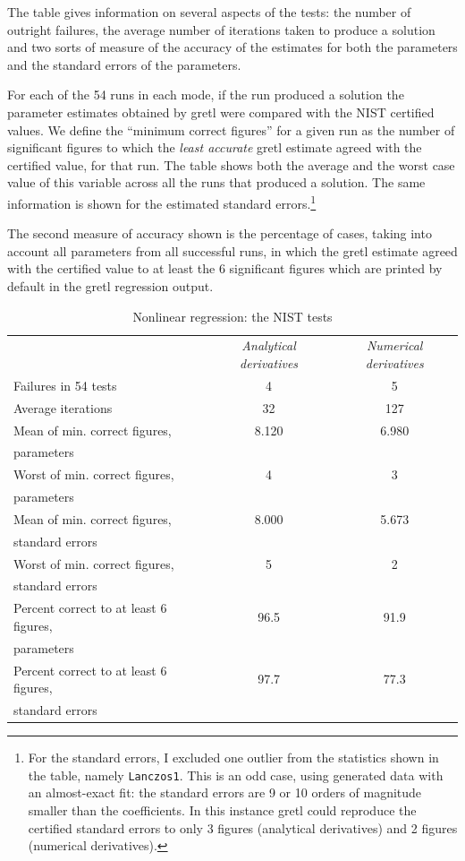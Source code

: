 The table gives information on several aspects of the tests: the
number of outright failures, the average number of iterations taken to
produce a solution and two sorts of measure of the accuracy of the
estimates for both the parameters and the standard errors of the
parameters.

For each of the 54 runs in each mode, if the run produced a solution
the parameter estimates obtained by gretl were compared with the
NIST certified values.  We define the ``minimum correct figures'' for
a given run as the number of significant figures to which the
\emph{least accurate} gretl estimate agreed with the certified
value, for that run. The table shows both the average and the worst
case value of this variable across all the runs that produced a
solution.  The same information is shown for the estimated standard
errors.\footnote{For the standard errors, I excluded one outlier from
  the statistics shown in the table, namely \verb+Lanczos1+.  This is
  an odd case, using generated data with an almost-exact fit: the
  standard errors are 9 or 10 orders of magnitude smaller than the
  coefficients.  In this instance gretl could reproduce the
  certified standard errors to only 3 figures (analytical derivatives)
  and 2 figures (numerical derivatives).}  

The second measure of accuracy shown is the percentage of cases,
taking into account all parameters from all successful runs, in which
the gretl estimate agreed with the certified value to at least
the 6 significant figures which are printed by default in the
gretl regression output.

\begin{table}[htbp]
 \caption{Nonlinear regression: the NIST tests}
 \label{tab-nls}
  \begin{center}
    \begin{tabular}{lcc}
      & \textit{Analytical derivatives} & 
      \textit{Numerical derivatives} \\ [4pt]
        Failures in 54 tests & 4 & 5\\
        Average iterations & 32 & 127\\
        Mean of min. correct figures, & 8.120 & 6.980\\
        parameters \\
        Worst of min. correct figures, & 4 & 3\\
        parameters \\
        Mean of min. correct figures, & 8.000 & 5.673\\
        standard errors \\
        Worst of min. correct figures, & 5 & 2\\
        standard errors \\
        Percent correct to at least 6 figures, & 96.5 & 91.9\\
        parameters \\
        Percent correct to at least 6 figures, & 97.7 & 77.3\\
        standard errors \\
      \end{tabular}
    \end{center}
  \end{table}

